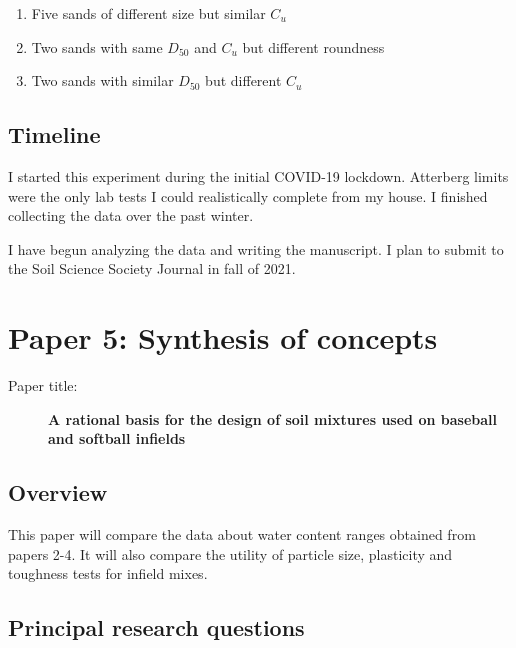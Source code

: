 \documentclass[
  letterpaper,
  openany]{book}
\begin{document}
\begin{enumerate}
\def\labelenumi{\arabic{enumi}.}
\item
  Five sands of different size but similar \(C_u\)
\item
  Two sands with same \(D_{50}\) and \(C_u\) but different roundness
\item
  Two sands with similar \(D_{50}\) but different \(C_u\)
\end{enumerate}

\hypertarget{timeline-3}{%
\subsection{Timeline}\label{timeline-3}}

I started this experiment during the initial COVID-19 lockdown.
Atterberg limits were the only lab tests I could realistically complete from my house.
I finished collecting the data over the past winter.

I have begun analyzing the data and writing the manuscript.
I plan to submit to the Soil Science Society Journal in fall of 2021.

\newpage

\hypertarget{paper-5-synthesis-of-concepts}{%
\section{Paper 5: Synthesis of concepts}\label{paper-5-synthesis-of-concepts}}

\begin{description}
\item[Paper title:]
\textbf{A rational basis for the design of soil mixtures used on baseball and softball infields}
\end{description}

\hypertarget{overview-4}{%
\subsection{Overview}\label{overview-4}}

This paper will compare the data about water content ranges obtained from papers 2-4.
It will also compare the utility of particle size, plasticity and toughness tests for infield mixes.

\hypertarget{principal-research-questions-4}{%
\subsection{Principal research questions}\label{principal-research-questions-4}}
\end{document}
